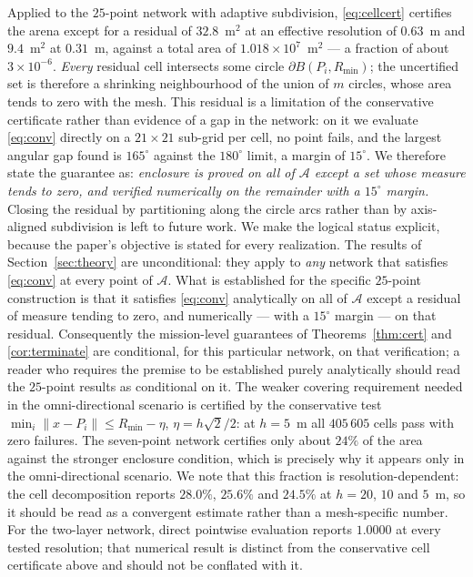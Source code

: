 \documentclass[preprint,12pt,3p]{elsarticle}
\theoremstyle{definition}
\newcommand{\Rmin}{R_{\min}}
\newcommand{\bA}{\mathcal{A}}
\begin{document}
Applied to the $25$-point network with adaptive subdivision, \eqref{eq:cellcert} certifies the
arena except for a residual of $32.8$~m$^2$ at an effective resolution of $0.63$~m and
$9.4$~m$^2$ at $0.31$~m, against a total area of $1.018\times10^{7}$~m$^2$ --- a fraction of about
$3\times10^{-6}$. \emph{Every} residual cell intersects some circle $\partial B(P_i,\Rmin)$; the
uncertified set is therefore a shrinking neighbourhood of the union of $m$ circles, whose area
tends to zero with the mesh. This residual is a limitation of the conservative certificate rather
than evidence of a gap in the network: on it we evaluate \eqref{eq:conv} directly on a
$21\times21$ sub-grid per cell, no point fails, and the largest angular gap found is
$165^\circ$ against the $180^\circ$ limit, a margin of $15^\circ$. We therefore state the
guarantee as: \emph{enclosure is proved on all of $\bA$ except a set whose measure tends to zero,
and verified numerically on the remainder with a $15^\circ$ margin.} Closing the residual by
partitioning along the circle arcs rather than by axis-aligned subdivision is left to future
work. We make the logical status explicit, because the paper's
objective is stated for every realization. The results of Section~\ref{sec:theory} are
unconditional: they apply to \emph{any} network that satisfies \eqref{eq:conv} at every point of
$\bA$. What is established for the specific $25$-point construction is that it satisfies
\eqref{eq:conv} analytically on all of $\bA$ except a residual of measure tending to zero, and
numerically --- with a $15^\circ$ margin --- on that residual. Consequently the mission-level
guarantees of Theorems~\ref{thm:cert} and \ref{cor:terminate} are conditional, for this particular
network, on that verification; a reader who requires the premise to be established purely
analytically should read the $25$-point results as conditional on it. The weaker
covering requirement needed in the omni-directional scenario is certified by the conservative test
$\min_i\|x-P_i\|\le\Rmin-\eta$, $\eta=h\sqrt2/2$: at $h=5$~m all $405\,605$ cells pass with zero
failures. The seven-point network certifies only about $24\%$ of the area against the stronger enclosure condition, which is precisely why it appears only in the omni-directional scenario. We note that this fraction is resolution-dependent: the cell decomposition reports $28.0\%$, $25.6\%$ and $24.5\%$ at $h=20$, $10$ and $5$~m, so it should be read as a convergent estimate rather than a mesh-specific number. For the two-layer network, direct pointwise evaluation reports $1.0000$ at every tested resolution; that numerical result is distinct from the conservative cell certificate above and should not be conflated with it.
\end{document}
